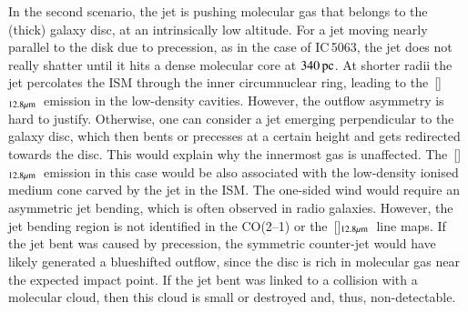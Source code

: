 \documentclass[longauth]{aa}
\newcommand{\neii}{\,\hbox{[\ion{Ne}{ii}]$_{\rm 12.8 \mu m}$}}
\begin{document}
In the second scenario, the jet is pushing molecular gas that belongs to the (thick) galaxy disc, at an intrinsically low altitude. For a jet moving nearly parallel to the disk due to precession, as in the case of IC\,5063, the jet does not really shatter until it hits a dense molecular core at $340\, \rm{pc}$. At shorter radii the jet percolates the ISM through the inner circumnuclear ring, leading to the \neii \ emission in the low-density cavities. However, the outflow asymmetry is hard to justify. Otherwise, one can consider a jet emerging perpendicular to the galaxy disc, which then bents or precesses at a certain height and gets redirected towards the disc. This would explain why the innermost gas is unaffected. The \neii \ emission in this case would be also associated with the low-density ionised medium cone carved by the jet in the ISM. The one-sided wind would require an asymmetric jet bending, which is often observed in radio galaxies. However, the jet bending region is not identified in the CO(2--1) or the \neii \ line maps. If the jet bent was caused by precession, the symmetric counter-jet would have likely generated a blueshifted outflow, since the disc is rich in molecular gas near the expected impact point. If the jet bent was linked to a collision with a molecular cloud, then this cloud is small or destroyed and, thus, non-detectable.
\end{document}
